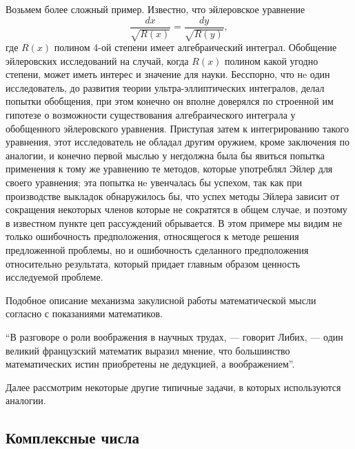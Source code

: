 Возьмем более сложный пример. Известно, что эйлеровское уравнение
\begin{equation}
  \frac{dx}{\sqrt{R(x)}}
  =
  \frac{dy}{\sqrt{R(y)}},
\end{equation}
где $R(x)$ полином 4-ой степени имеет алгебраический интеграл. Обобщение
эйлеровских исследований на случай, когда $R(x)$ полином какой угодно степени,
может иметь интерес и значение для науки. Бесспорно, что нe один исследователь,
до развития теории ультра-эллиптических интегралов, делал попытки обобщения,
при этом конечно он вполне доверялся по строенной им гипотезе о возможности
существования алгебраического интеграла у обобщенного эйлеровского уравнения.
Приступая затем к интегрированию такого уравнения, этот исследователь не
обладал другим оружием, кроме заключения по аналогии, и конечно первой мыслью
у негдолжна была бы явиться попытка применения к тому же уравнению те методов,
которые употреблял Эйлер для своего уравнения; эта попытка нe увенчалась бы
успехом, так как при производстве выкладок обнаружилось бы, что успех методы
Эйлера зависит от сокращения некоторых членов которые не сократятся в общем
случае, и поэтому в известном пункте цеп рассуждений обрывается. В этом примере
мы видим не только ошибочность предположения, относящегося к методе решения
предложенной проблемы, но и ошибочность сделанного предположения относительно
результата, который придает главным образом ценность исследуемой проблеме. 

Подобное описание механизма закулисной работы математической мысли согласно с
показаниями математиков. 

\begin{displayquote}
  ``В разговоре о роли воображения в научных трудах, --- говорит Либих, ---
  один великий французский математик выразил мнение, что большинство
  математических истин приобретены не дедукцией, а воображением''. 
\end{displayquote}

Далее рассмотрим некоторые другие типичные задачи, в которых используются
аналогии.

\subsection{Комплексные числа}

